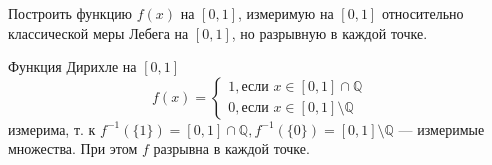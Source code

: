 \begin{task}{5}
Построить функцию $f(x)$ на $[0, 1]$, измеримую на $[0, 1]$ относительно классической меры Лебега на $[0, 1]$, но разрывную в каждой точке.
\end{task}

\begin{solution}
Функция Дирихле на $[0, 1]$
$$ f(x) =
\begin{cases}
1, \text{если $x \in [0, 1] \cap \mathbb{Q}$} \\
0, \text{если $x \in [0, 1] \setminus \mathbb{Q}$}
\end{cases} $$
измерима, т. к $f^{-1}(\{1\}) = [0, 1] \cap \mathbb{Q}, f^{-1}(\{0\}) = [0, 1] \setminus \mathbb{Q}$ --- измеримые множества. При этом $f$ разрывна в каждой точке.
\end{solution}